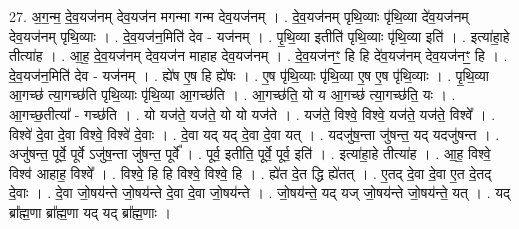 \documentclass[17pt]{extarticle}
\begin{document}
27. अ॒ग॒न्म॒ दे॒व॒यज॑नम् देव॒यज॑न मगन्मा गन्म देव॒यज॑नम् । . दे॒व॒यज॑नम् पृथि॒व्याः पृ॑थि॒व्या दे॑व॒यज॑नम् देव॒यज॑नम् पृथि॒व्याः । . दे॒व॒यज॑न॒मिति॑ देव - यज॑नम् । . पृ॒थि॒व्या इतीति॑ पृथि॒व्याः पृ॑थि॒व्या इति॑ । . इत्या॑हा॒हे तीत्या॑ह । . आ॒ह॒ दे॒व॒यज॑नम् देव॒यज॑न माहाह देव॒यज॑नम् । . दे॒व॒यज॑नꣳ॒॒ हि हि दे॑व॒यज॑नम् देव॒यज॑नꣳ॒॒ हि । . दे॒व॒यज॑न॒मिति॑ देव - यज॑नम् । . ह्ये॑ष ए॒ष हि ह्ये॑षः । . ए॒ष पृ॑थि॒व्याः पृ॑थि॒व्या ए॒ष ए॒ष पृ॑थि॒व्याः । . पृ॒थि॒व्या आ॒गच्छ॑ त्या॒गच्छ॑ति पृथि॒व्याः पृ॑थि॒व्या आ॒गच्छ॑ति । . आ॒गच्छ॑ति॒ यो य आ॒गच्छ॑ त्या॒गच्छ॑ति॒ यः । . आ॒गच्छ॒तीत्या᳚ - गच्छ॑ति । . यो यज॑ते॒ यज॑ते॒ यो यो यज॑ते । . यज॑ते॒ विश्वे॒ विश्वे॒ यज॑ते॒ यज॑ते॒ विश्वे᳚ । . विश्वे॑ दे॒वा दे॒वा विश्वे॒ विश्वे॑ दे॒वाः । . दे॒वा यद् यद् दे॒वा दे॒वा यत् । . यदजु॑ष॒न्ता जु॑षन्त॒ यद् यदजु॑षन्त । . अजु॑षन्त॒ पूर्वे॒ पूर्वे ऽजु॑ष॒न्ता जु॑षन्त॒ पूर्वे᳚ । . पूर्व॒ इतीति॒ पूर्वे॒ पूर्व॒ इति॑ । . इत्या॑हा॒हे तीत्या॑ह । . आ॒ह॒ विश्वे॒ विश्व॑ आहाह॒ विश्वे᳚ । . विश्वे॒ हि हि विश्वे॒ विश्वे॒ हि । . ह्ये॑त दे॒त द्धि ह्ये॑तत् । . ए॒तद् दे॒वा दे॒वा ए॒त दे॒तद् दे॒वाः । . दे॒वा जो॒षय॑न्ते जो॒षय॑न्ते दे॒वा दे॒वा जो॒षय॑न्ते । . जो॒षय॑न्ते॒ यद् यज् जो॒षय॑न्ते जो॒षय॑न्ते॒ यत् । . यद् ब्रा᳚ह्म॒णा ब्रा᳚ह्म॒णा यद् यद् ब्रा᳚ह्म॒णाः । \newline
\end{document}
